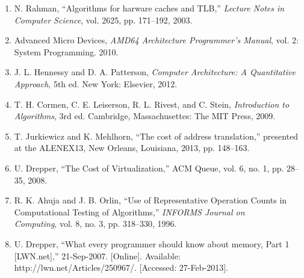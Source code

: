   \begin{enumerate}
    \item N. Rahman, “Algorithms for harware caches and TLB,” \textit{Lecture
    Notes in Computer Science}, vol. 2625, pp. 171–192, 2003.
    
    \item Advanced Micro Devices, \textit{AMD64 Architecture Programmer’s
    Manual}, vol. 2: System Programming. 2010.
    
    \item  J. L. Hennessy and D. A. Patterson, \textit{Computer Architecture: A
    Quantitative Approach}, 5th ed. New York: Elsevier, 2012.
    
    \item T. H. Cormen, C. E. Leiserson, R. L. Rivest, and C. Stein,
    \textit{Introduction to Algorithms}, 3rd ed. Cambridge, Massachusettes: The
    MIT Press, 2009.
    
    \item T. Jurkiewicz and K. Mehlhorn, “The cost of address
    translation,” presented at the ALENEX13, New Orleans, Louisiana, 2013, pp.
    148–163.
    
    \item U. Drepper, “The Cost of Virtualization,” ACM Queue, vol. 6, no. 1,
    pp. 28–35, 2008.
    
    \item R. K. Ahuja and J. B. Orlin, “Use of Representative Operation Counts
    in Computational Testing of Algorithms,” 
    \textit{INFORMS Journal on\\Computing}, vol. 8, no. 3, pp. 318–330, 1996.
    
    \item U. Drepper, “What every programmer should know about memory, Part 1
    [LWN.net],” 21-Sep-2007. [Online]. Available:
    \\http://lwn.net/Articles/250967/. [Accessed: 27-Feb-2013].
    
  \end{enumerate}
